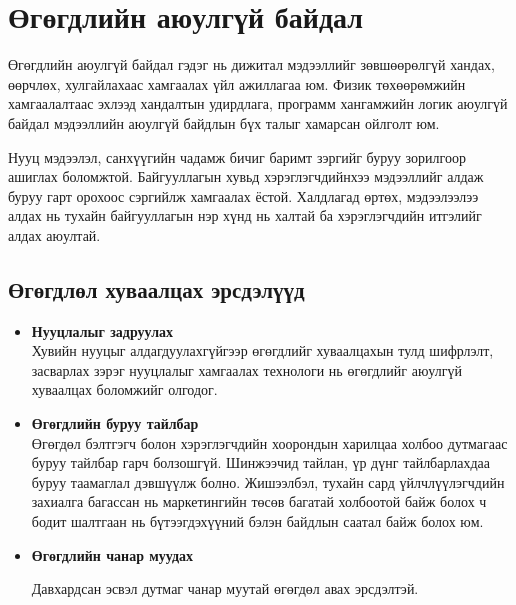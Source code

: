 \section{Өгөгдлийн аюулгүй байдал}
Өгөгдлийн аюулгүй байдал гэдэг нь дижитал мэдээллийг зөвшөөрөлгүй хандах, өөрчлөх, хулгайлахаас хамгаалах үйл ажиллагаа юм. Физик төхөөрөмжийн хамгаалалтаас эхлээд хандалтын удирдлага, программ хангамжийн логик аюулгүй байдал мэдээллийн аюулгүй байдлын бүх талыг хамарсан ойлголт юм. \cite{IBMSecureData}

Нууц мэдээлэл, санхүүгийн чадамж бичиг баримт зэргийг буруу зорилгоор ашиглах боломжтой.
Байгууллагын хувьд хэрэглэгчдийнхээ мэдээллийг алдаж буруу гарт орохоос сэргийлж хамгаалах ёстой. Халдлагад өртөх, мэдээлээлээ алдах нь тухайн байгууллагын нэр хүнд нь халтай ба хэрэглэгчдийн итгэлийг алдах аюултай.

\subsection*{Өгөгдлөл хуваалцах эрсдэлүүд}

\begin{itemize}
    \item \textbf{Нууцлалыг задруулах}\\
    Хувийн нууцыг алдагдуулахгүйгээр өгөгдлийг хуваалцахын тулд шифрлэлт, засварлах зэрэг нууцлалыг хамгаалах технологи нь өгөгдлийг аюулгүй хуваалцах боломжийг олгодог.
    \item \textbf{Өгөгдлийн буруу тайлбар}\\
    Өгөгдөл бэлтгэгч болон хэрэглэгчдийн хоорондын харилцаа холбоо дутмагаас буруу тайлбар гарч болзошгүй. Шинжээчид тайлан, үр дүнг тайлбарлахдаа буруу таамаглал дэвшүүлж болно. Жишээлбэл, тухайн сард үйлчлүүлэгчдийн захиалга багассан нь маркетингийн төсөв багатай холбоотой байж болох ч бодит шалтгаан нь бүтээгдэхүүний бэлэн байдлын саатал байж болох юм.
    \item \textbf{Өгөгдлийн чанар муудах}
    
    Давхардсан эсвэл дутмаг чанар муутай өгөгдөл авах эрсдэлтэй.
\end{itemize}

